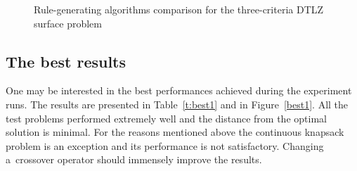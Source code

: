 \begin{figure}
  \centering
  \caption{Rule-generating algorithms comparison for the three-criteria DTLZ surface problem}
  \label{c3_surface_algo}
\end{figure}


\clearpage{}

\subsection{The best results}
One may be interested in the best performances achieved during the experiment
runs. The results are presented in Table~\ref{t:best1} and in
Figure~\ref{best1}. All the test problems performed extremely well and the
distance from the optimal solution is minimal. For the reasons mentioned above
the continuous knapsack problem is an exception and its performance is not
satisfactory. Changing a~crossover operator should immensely improve the
results.

